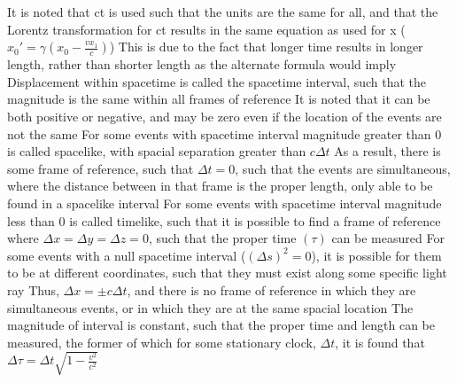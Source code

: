 \documentclass[11 pt, twoside]{article}
\newenvironment{outline*}
{
	\begin{outline}[enumerate]
	}
	{\end{outline}
}
\begin{document}
\begin{outline*}
\4 It is noted that ct is used such that the units are the same for all, and that the Lorentz transformation for ct results in the same equation as used for x ($x_0' = \gamma (x_0 - \frac{vx_1}{c})$)
\3 This is due to the fact that longer time results in longer length, rather than shorter length as the alternate formula would imply
\2 Displacement within spacetime is called the spacetime interval, such that the magnitude is the same within all frames of reference
\3 It is noted that it can be both positive or negative, and may be zero even if the location of the events are not the same
\3 For some events with spacetime interval magnitude greater than 0 is called spacelike, with spacial separation greater than $c\Delta t$
\4 As a result, there is some frame of reference, such that $\Delta t = 0$, such that the events are simultaneous, where the distance between in that frame is the proper length, only able to be found in a spacelike interval
\3 For some events with spacetime interval magnitude less than 0 is called timelike, such that it is possible to find a frame of reference where $\Delta x = \Delta y = \Delta z = 0$, such that the proper time $(\tau)$ can be measured
\3 For some events with a null spacetime interval ($(\Delta s)^2 = 0$), it is possible for them to be at different coordinates, such that they must exist along some specific light ray
\4 Thus, $\Delta x = \pm c\Delta t$, and there is no frame of reference in which they are simultaneous events, or in which they are at the same spacial location
\3 The magnitude of interval is constant, such that the proper time and length can be measured, the former of which for some stationary clock, $\Delta t$, it is found that $\Delta \tau = \Delta t \sqrt{1 - \frac{v^2}{c^2}}$
\end{outline*}
\end{document}
